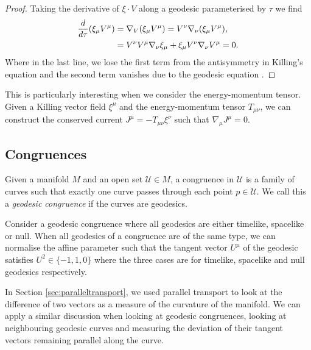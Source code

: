\begin{proof}
Taking the derivative of $\xi \cdot V$ along a geodesic parameterised by $\tau$ we find
\begin{equation*}
  \begin{aligned}
    	\frac{d }{d \tau} (\xi_\mu V^\mu) &= \nabla_V (\xi_\mu V^\mu) =  V^\nu \nabla_\nu (\xi_\mu V^\mu), \\
    	&= V^\nu V^\mu \nabla_\nu \xi_{\mu} + \xi_{\mu}  V^\nu \nabla_\nu V^\mu = 0.
  \end{aligned}
\end{equation*}
Where in the last line, we lose the first term from the antisymmetry in Killing's equation  and the second term vanishes due to the geodesic equation .
\end{proof}

This is particularly interesting when we consider the energy-momentum tensor. Given a Killing vector field $\xi^\mu$ and the energy-momentum tensor $T_{\mu \nu}$, we can construct the conserved current $J^\mu = -T_{\mu \nu} \xi^\nu$ such that $\nabla_\mu J^\mu = 0$.

\subsection{Congruences}
\label{sec:congruences}

\begin{defn}
	Given a manifold $M$ and an open set $\mathcal{U} \in M$, a congruence in $\mathcal{U}$ is a family of curves such that exactly one curve passes through each point $p \in \mathcal{U}$. We call this a \emph{geodesic congruence} if the curves are geodesics. 
\end{defn}

Consider a geodesic congruence where all geodesics are either timelike, spacelike or null. When all geodesics of a congruence are of the same type, we can normalise the affine parameter such that the tangent vector $U^\mu$ of the geodesic satisfies $U^2 \in \{-1,1,0\}$ where the three cases are for timelike, spacelike and null geodesics respectively.

In Section \ref{sec:paralleltransport}, we used parallel transport to look at the difference of two vectors as a measure of the curvature of the manifold. We can apply a similar discussion when looking at geodesic congruences, looking at neighbouring geodesic curves and measuring the deviation of their tangent vectors remaining parallel along the curve.

